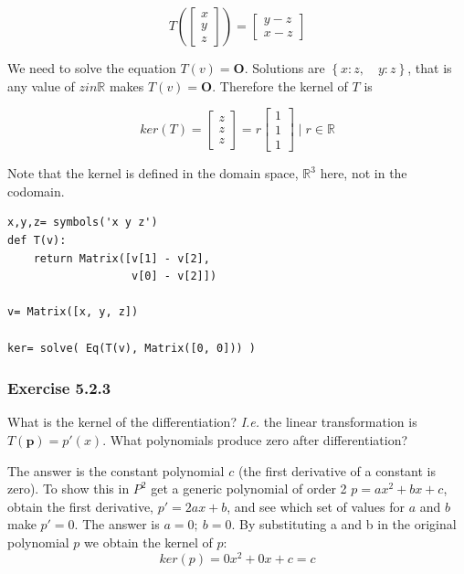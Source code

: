 $$
T(\left[\begin{matrix}x\\y\\z\end{matrix}\right]) = \left[\begin{matrix}y - z\\x - z\end{matrix}\right]
$$

We need to solve the equation $T(v) = \mathbf{O}$. Solutions are
$\left \{ x : z, \quad y : z\right \}$, that is any value of $z in \mathbb{R}$
makes $T(v) = \mathbf{O}$. Therefore the kernel of $T$ is

$$
ker(T) = \left[\begin{matrix}z\\z\\z\end{matrix}\right] = r \left[\begin{matrix}1\\1\\1\end{matrix}\right]
\mid r \in \mathbb{R}
$$

Note that the kernel is defined in the domain space, $\mathbb{R}^3$ here, not in the
codomain. 

\begin{verbatim}
x,y,z= symbols('x y z')
def T(v):
    return Matrix([v[1] - v[2],
                   v[0] - v[2]])

v= Matrix([x, y, z])

ker= solve( Eq(T(v), Matrix([0, 0])) )
\end{verbatim}

\subsubsection{Exercise 5.2.3}

What is the kernel of the differentiation? \emph{I.e.} the linear transformation
is $T(\mathbf{p}) = p\prime(x)$. What polynomials produce zero after differentiation?

The answer is the constant polynomial $c$ (the first derivative of a constant is
zero). To show this in $P^2$ get a generic polynomial of order 2 $p= a x^2 + b x + c$,
obtain the first derivative, $p\prime= 2 a x + b$, and see which set of values for $a$ and
$b$ make $p\prime= 0$. The answer is $a= 0;\ b= 0$. By substituting a and b in
the original polynomial $p$ we obtain the kernel of $p$:
$$
ker(p) = 0 x^2 + 0 x + c = c
$$

